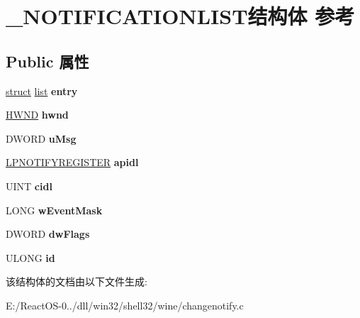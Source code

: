 \hypertarget{struct___n_o_t_i_f_i_c_a_t_i_o_n_l_i_s_t}{}\section{\+\_\+\+N\+O\+T\+I\+F\+I\+C\+A\+T\+I\+O\+N\+L\+I\+S\+T结构体 参考}
\label{struct___n_o_t_i_f_i_c_a_t_i_o_n_l_i_s_t}
\subsection*{Public 属性}
\begin{DoxyCompactItemize}
\item 
\mbox{\label{struct___n_o_t_i_f_i_c_a_t_i_o_n_l_i_s_t_a343d63bb86da16fbd5b5a8e0d68714f2}} 
\hyperlink{interfacestruct}{struct} \hyperlink{classlist}{list} {\bfseries entry}
\item 
\mbox{\label{struct___n_o_t_i_f_i_c_a_t_i_o_n_l_i_s_t_a3acdb7288631fa9b932f8cc53a2edacd}} 
\hyperlink{interfacevoid}{H\+W\+ND} {\bfseries hwnd}
\item 
\mbox{\label{struct___n_o_t_i_f_i_c_a_t_i_o_n_l_i_s_t_aa56d1a2ecf3daf68ae7872ce9b52f673}} 
D\+W\+O\+RD {\bfseries u\+Msg}
\item 
\mbox{\label{struct___n_o_t_i_f_i_c_a_t_i_o_n_l_i_s_t_a90fadf4d2d35a7995b31e9b104e13d43}} 
\hyperlink{struct___s_h_change_notify_entry}{L\+P\+N\+O\+T\+I\+F\+Y\+R\+E\+G\+I\+S\+T\+ER} {\bfseries apidl}
\item 
\mbox{\label{struct___n_o_t_i_f_i_c_a_t_i_o_n_l_i_s_t_a9fff8a9b1e6cf0b9ff02c26469a8733a}} 
U\+I\+NT {\bfseries cidl}
\item 
\mbox{\label{struct___n_o_t_i_f_i_c_a_t_i_o_n_l_i_s_t_a7998c0e457f927229933d70fcf46d26c}} 
L\+O\+NG {\bfseries w\+Event\+Mask}
\item 
\mbox{\label{struct___n_o_t_i_f_i_c_a_t_i_o_n_l_i_s_t_a0638c4d6c13a8ded2e82d4828accb535}} 
D\+W\+O\+RD {\bfseries dw\+Flags}
\item 
\mbox{\label{struct___n_o_t_i_f_i_c_a_t_i_o_n_l_i_s_t_abe61903848b1d71337ca15bc421a87ca}} 
U\+L\+O\+NG {\bfseries id}
\end{DoxyCompactItemize}


该结构体的文档由以下文件生成\+:\begin{DoxyCompactItemize}
\item 
E\+:/\+React\+O\+S-\/0../dll/win32/shell32/wine/changenotify.\+c\end{DoxyCompactItemize}

